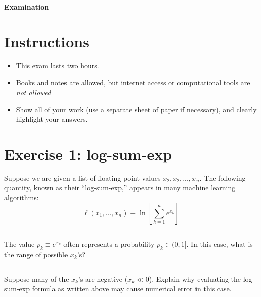 

\lstset{
  language=Algo,
  basicstyle=\sffamily,
  columns=fullflexible,
  mathescape
}

\begin{center}
{\large\textbf{Examination}}\\
\end{center}

\noindent\makebox[\linewidth]{\rule{\linewidth}{0.6pt}}
 
\section{Instructions}

\begin{itemize}
\item This exam lasts two hours.
\item Books and notes are allowed, but internet access or computational tools are {\em not allowed}
\item Show all of your work (use a separate sheet of paper if necessary), and clearly highlight your answers.
\end{itemize}





\noindent\makebox[\linewidth]{\rule{\linewidth}{0.6pt}}

\section{Exercise 1: log-sum-exp}

Suppose we are given a list of floating point values $x_2, x_2, ..., x_n$. The following quantity, known as their ``log-sum-exp,'' appears in many machine learning algorithms:
\begin{equation*}
\ell(x_1,...,x_n)\equiv \ln\left[\sum_{k=1}^n e^{x_k}\right]
\end{equation*}

\subsection{} The value $p_k\equiv e^{x_k}$ often represents a probability $p_k \in (0,1]$. In this case, what is the range of possible $x_k$'s?
\vspace{8cm}

\subsection{} Suppose many of the $x_k$'s are negative ($x_k \ll 0$). Explain why evaluating the log-sum-exp formula as written above may cause numerical error in this case.
\vspace{8cm}

